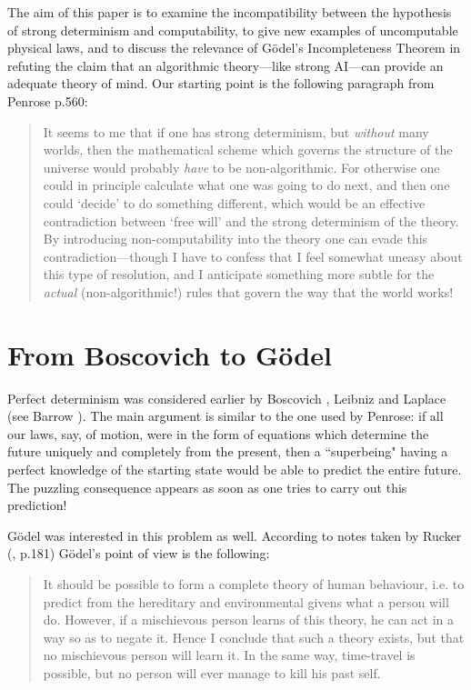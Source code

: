 The aim of this paper is to examine the incompatibility between
the hypothesis of strong determinism and computability,  to give
new examples of uncomputable physical laws, and  to discuss the relevance of
G\" odel's Incompleteness Theorem in  refuting  the claim
that an algorithmic theory---like strong AI---can provide an adequate
theory of mind.
Our starting point is the following paragraph  from Penrose \cite{penrose}
p.560:
\begin{quote}
It seems to me that if one has strong determinism, but {\it without} many
worlds,
then the mathematical scheme which governs the structure  of the universe would
probably {\it have} to be non-algorithmic. For otherwise one could in
principle calculate what one was going to do next, and then one could `decide'
to do something different, which would be an effective contradiction between
`free will' and the strong determinism of the theory. By introducing
non-computability
into the theory one can evade this contradiction---though I have to confess
that I
 feel somewhat uneasy about this type of resolution, and I anticipate
something more
subtle for the {\it actual} (non-algorithmic!) rules that govern the way
that the world works!
\end{quote}



\section{From Boscovich to G\"odel}
Perfect determinism was considered earlier by Boscovich \cite{boscovich},
Leibniz and Laplace
(see Barrow \cite{barrow}). The main argument is similar to the one used by
Penrose:
if all our laws, say, of motion, were in the form of equations which
determine the future
uniquely and completely from the present, then a ``superbeing"  having a
perfect knowledge
of the starting state would be able  to predict the entire future. The
puzzling consequence
appears as soon as one tries  to carry out this prediction!

G\" odel was interested in this problem as well.
According to notes taken by Rucker   (\cite{rucker1}, p.181)  G\" odel's
point of view
is the following:

\begin{quote}
It should be possible to form a complete theory of human behaviour, i.e. to
predict from the
hereditary and environmental givens what a person will do. However, if a
mischievous
person learns of this theory, he can act in a way so as to negate it. Hence I
conclude that such a theory exists, but that no mischievous person will
learn it. In the same
way, time-travel is possible, but no person will ever manage to kill his
past self.
\end{quote}

